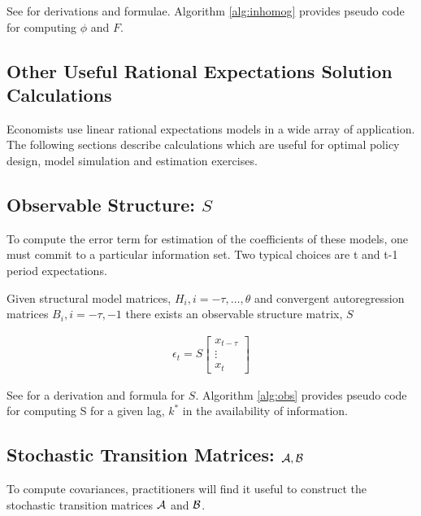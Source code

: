 \documentclass[12pt]{elsart}
\begin{document}
See \cite{anderson10} for  derivations and formulae.
Algorithm \ref{alg:inhomog} provides pseudo code for computing $\phi$ and $F$.


\subsection{Other Useful Rational Expectations Solution Calculations}
\label{sec:useful}


Economists use linear rational expectations models in a wide array of
application. 
The following sections describe calculations which are 
useful for optimal policy design, model simulation and estimation exercises.




\subsection{Observable Structure:  $S$}

\label{sec:applications}



\label{sec:errorCalc}


To compute the error term for estimation of the coefficients of these models,
one must commit to a particular information set.
Two typical choices are t and t-1 period expectations.





Given structural model matrices, $H_i, i=-\tau,\ldots,\theta$ 
and 
 convergent autoregression matrices $B_i,i=-\tau,-1$
there exists an 
{ observable structure matrix,\/} $S$




\begin{gather}
  \epsilon_t= S \begin{bmatrix}
 x_{t-\tau}\\\vdots\\x_{t}
\end{bmatrix}
\end{gather}

See \cite{anderson10} for a derivation and formula for $S$.
Algorithm \ref{alg:obs} provides pseudo code for computing S for a given lag, $k^\ast$ in the availability of information.


\subsection{Stochastic Transition Matrices:  $\mathcal{A}, \mathcal{B}$}
\label{sec:stochtrans}
To compute covariances, practitioners will find it useful to  construct
the stochastic transition matrices $\mathcal{A}$ and $\mathcal{B}$. 
\end{document}
